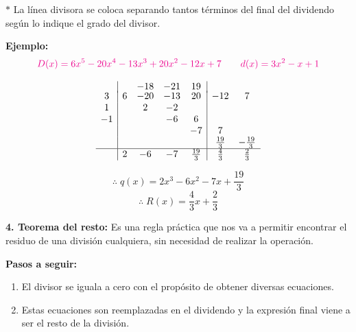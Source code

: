 \documentclass[11pt,a4paper]{article}
\newcommand{\cn}[1]{\raisebox{.5pt}{\textcircled{\raisebox{-.9pt}{\scriptsize #1}}}}
\begin{document}
\begin{minipage}{0.485\textwidth}
\centering
{}
\end{minipage}\hfill
\begin{minipage}{0.485\textwidth}
$\ast$ La línea divisora se coloca separando tantos términos del final del dividendo
según lo indique el grado del divisor.
\end{minipage}

\bigskip
\textcolor{naranja}{\textbf{Ejemplo:}}
\[
\textcolor{magenta}{D(x) = 6x^5 - 20x^4 - 13x^3 + 20x^2 - 12x + 7} \qquad
\textcolor{magenta}{d(x) = 3x^2 - x + 1}
\]
\begin{minipage}{0.533\textwidth}
\[
\begin{array}{c|cccc|cc}
   &   & -18 & -21 & 19 & & \\[-2pt]
3  & 6 & -20 & -13 & 20 & -12 & 7\\
1  &   & 2   & -2  &    &     & \\
-1 &   &     & -6  & 6  &     & \\
   &   &     &     & -7 & 7   & \\
   &   &     &     &    & \frac{19}{3} & -\frac{19}{3}\\ \hline
   & 2 & -6  & -7  & \frac{19}{3} & \frac{4}{3} & \frac{2}{3}
\end{array}
\]
\end{minipage}\hfill
\begin{minipage}{0.436\textwidth}
\[\therefore\; q(x) = 2x^3 - 6x^2 - 7x + \frac{19}{3}\]
\[\therefore\; R(x) = \frac{4}{3}x + \frac{2}{3}\]
\end{minipage}

\bigskip
\textbf{4. Teorema del resto:} Es una regla práctica que nos va a permitir encontrar el
residuo de una división cualquiera, sin necesidad de realizar la operación.

\textcolor{verde}{\textbf{Pasos a seguir:}}
\begin{enumerate}
  \item El divisor se iguala a cero con el propósito de obtener diversas ecuaciones.
  \item Estas ecuaciones son reemplazadas en el dividendo y la expresión final viene a
  ser el resto de la división.
\end{enumerate}
\end{document}
